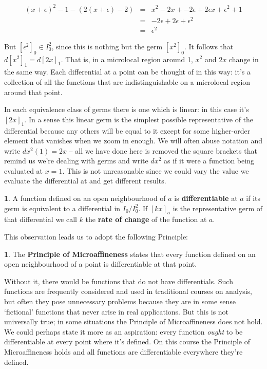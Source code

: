 \documentclass[oneside,english]{amsbook}
\numberwithin{section}{chapter}
\theoremstyle{plain}
\theoremstyle{definition}
\newtheorem{defn}[thm]{\protect\definitionname}
\providecommand{\definitionname}{Definition}
\begin{document}
			\begin{align}[rcl]
				(x + \epsilon)^2 - 1 - (2(x + \epsilon) - 2) &=& x^2 - 2x + - 2\epsilon + 2\epsilon x + \epsilon^2 +1 \\
                                           &=& - 2\epsilon + 2\epsilon + \epsilon^2 \\
                                           &=& \epsilon^2
			\end{align}

			But $[\epsilon^2]_0 \in I_0^2$, since this is nothing but the germ $[x^2]_0$. It follows that $d[x^2]_1 = d[2x]_1$. That is, in a microlocal region around 1, $x^2$ and $2x$ change in the same way. Each differential at a point can be thought of in this way: it's a collection of all the functions that are indistinguishable on a microlocal region around that point. 
			
			In each equivalence class of germs there is one which is linear: in this case it's $[2x]_1$. In a sense this linear germ is the simplest possible representative of the differential because any others will be equal to it except for some higher-order element that vanishes when we zoom in enough. We will often abuse notation and write $dx^2(1) = 2x$ -- all we have done here is removed the square brackets that remind us we're dealing with germs and write $dx^2$ as if it were a function being evaluated at $x = 1$. This is not unreasonable since we could vary the value we evaluate the differential at and get different results. 

			\begin{defn}
				A function defined on an open neighbourhood of $a$ is \textbf{differentiable} at $a$ if its germ is equivalent to a differential in $I_0/I_0^2$. If $[kx]_a$ is the representative germ of that differential we call $k$ the \textbf{rate of change} of the function at $a$. 
			\end{defn}
			
			This observation leads us to adopt the following Principle: 

			\begin{defn}
				The \textbf{Principle of Microaffineness} states that every function defined on an open neighbourhood of a point is differentiable at that point. 
			\end{defn}
			
			Without it, there would be functions that do not have differentials. Such functions are frequently considered and used in traditional courses on analysis, but often they pose unnecessary problems because they are in some sense `fictional' functions that never arise in real applications. But this is not universally true; in some situations the Principle of Microaffineness does not hold. We could perhaps state it more as an aspiration: every function \emph{ought} to be differentiable at every point where it's defined. On this course the Principle of Microaffineness holds and all functions are differentiable everywhere they're defined.
			
\end{document}
